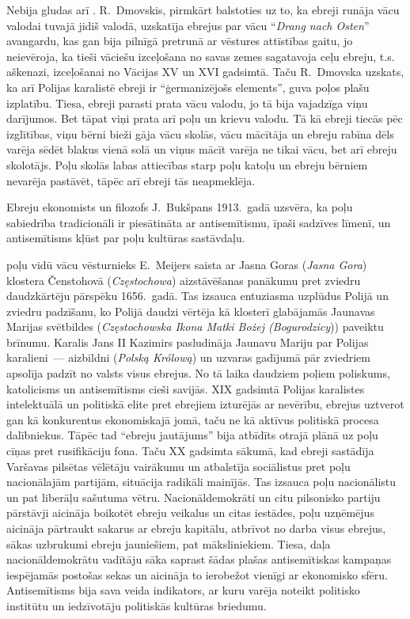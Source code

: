 \documentclass[twoside,a5paper,12pt,fleqn,openany]{extbook}
\newcommand{\pltxti}[1]{\textit{\textpolish{#1}}}
\newcommand{\detxti}[1]{\textit{\textgerman{#1}}}
\begin{document}
Nebija gludas arī . R.~Dmovskis, pirmkārt balstoties uz to, ka ebreji runāja vācu valodai tuvajā jidiš valodā, uzskatīja ebrejus par vācu ``\detxti{Drang nach Osten}'' avangardu, kas gan bija pilnīgā pretrunā ar vēstures attīstības gaitu, jo neievēroja, ka tieši vāciešu izceļošana no savas zemes sagatavoja ceļu ebreju, t.s. aškenazi, izceļošanai no Vācijas XV un XVI gadsimtā. Taču R.~Dmovska uzskats, ka arī Polijas karalistē ebreji ir ``ģermanizējošs elements'', guva poļos plašu izplatību. Tiesa, ebreji parasti prata vācu valodu, jo tā bija vajadzīga viņu darījumos. Bet tāpat viņi prata arī poļu un krievu valodu. Tā kā ebreji tiecās pēc izglītības, viņu bērni bieži gāja vācu skolās, vācu mācītāja un ebreju rabīna dēls varēja sēdēt blakus vienā solā un viņus mācīt varēja ne tikai vācu, bet arī ebreju skolotājs. Poļu skolās labas attiecības starp poļu katoļu un ebreju bērniem nevarēja pastāvēt, tāpēc arī ebreji tās neapmeklēja.

Ebreju ekonomists un filozofs J.~Bukšpans 1913.~gadā uzsvēra, ka poļu sabiedrība tradicionāli ir piesātināta ar antisemītismu, īpaši sadzīves līmenī, un antisemītisms kļūst par poļu kultūras sastāvdaļu.

 poļu vidū vācu vēsturnieks E.~Meijers saista ar Jasna Goras (\pltxti{Jasna Gora}) klostera Čenstohovā (\pltxti{Częstochowa}) aizstāvēšanas panākumu pret zviedru daudzkārtēju pārspēku 1656.~gadā. Tas izsauca entuziasma uzplūdus Polijā un zviedru padzīšanu, ko Polijā daudzi vērtēja kā klosterī glabājamās Jaunavas Marijas svētbildes (\pltxti{Częstochowska Ikona Matki Bożej (Bogurodzicy})) paveiktu brīnumu. Karalis Jans II Kazimirs pasludināja Jaunavu Mariju par Polijas karalieni~--- aizbildni (\pltxti{Polską Królową}) un uzvaras gadījumā pār zviedriem apsolīja padzīt no valsts visus ebrejus. No tā laika daudziem poļiem poliskums, katolicisms un antisemītisms cieši savijās. XIX gadsimtā Polijas karalistes intelektuālā un politiskā elite pret ebrejiem izturējās ar nevērību, ebrejus uztverot gan kā konkurentus ekonomiskajā jomā, taču ne kā aktīvus politiskā procesa dalībniekus. Tāpēc tad ``ebreju jautājums'' bija atbīdīts otrajā plānā uz poļu cīņas pret rusifikāciju fona. Taču XX gadsimta sākumā, kad ebreji sastādīja Varšavas pilsētas vēlētāju vairākumu un atbalstīja sociālistus pret poļu nacionālajām partijām, situācija radikāli mainījās. Tas izsauca poļu nacionālistu un pat liberāļu sašutuma vētru. Nacionāldemokrāti un citu pilsonisko partiju pārstāvji aicināja boikotēt ebreju veikalus un citas iestādes, poļu uzņēmējus aicināja pārtraukt sakarus ar ebreju kapitālu, atbrīvot no darba visus ebrejus, sākas uzbrukumi ebreju jauniešiem, pat māksliniekiem. Tiesa, daļa nacionāldemokrātu vadītāju sāka saprast šādas plašas antisemītiskas kampaņas iespējamās postošas sekas un aicināja to ierobežot vienīgi ar ekonomisko sfēru. Antisemītisms bija sava veida indikators, ar kuru varēja noteikt politisko institūtu un iedzīvotāju politiskās kultūras briedumu.
\end{document}
